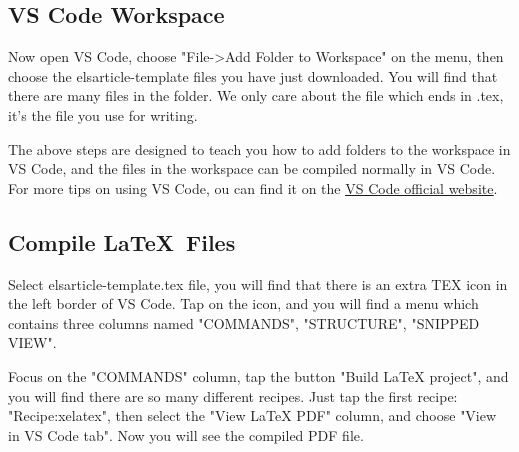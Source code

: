 \documentclass[conference]{IEEEtran}
\begin{document}
\subsection{VS Code Workspace}
Now open VS Code, choose "File->Add Folder to Workspace" on the menu, then choose the elsarticle-template files you have just downloaded.
You will find that there are many files in the folder. 
We only care about the file which ends in .tex, it's the file you use for writing.

The above steps are designed to teach you how to add folders to the workspace in VS Code, 
and the files in the workspace can be compiled normally in VS Code. 
For more tips on using VS Code, 
ou can find it on the \href{https://code.visualstudio.com/learn}{\underline{VS Code official website}}.

\subsection{Compile \LaTeX\ Files}
Select elsarticle-template.tex file, you will find that there is an extra TEX icon in the left border of VS Code.
Tap on the icon, and you will find a menu which contains three columns named "COMMANDS", "STRUCTURE", "SNIPPED VIEW".

Focus on the "COMMANDS" column, tap the button "Build LaTeX project", and you will find there are so many different recipes.
Just tap the first recipe: "Recipe:xelatex", then select the "View LaTeX PDF" column, and choose "View in VS Code tab".
Now you will see the compiled PDF file.



    


\end{document}
